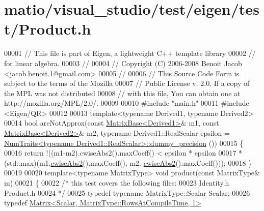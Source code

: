 \hypertarget{matio_2visual__studio_2test_2eigen_2test_2_product_8h_source}{}\section{matio/visual\+\_\+studio/test/eigen/test/\+Product.h}
\label{matio_2visual__studio_2test_2eigen_2test_2_product_8h_source}

\begin{DoxyCode}
00001 \textcolor{comment}{// This file is part of Eigen, a lightweight C++ template library}
00002 \textcolor{comment}{// for linear algebra.}
00003 \textcolor{comment}{//}
00004 \textcolor{comment}{// Copyright (C) 2006-2008 Benoit Jacob <jacob.benoit.1@gmail.com>}
00005 \textcolor{comment}{//}
00006 \textcolor{comment}{// This Source Code Form is subject to the terms of the Mozilla}
00007 \textcolor{comment}{// Public License v. 2.0. If a copy of the MPL was not distributed}
00008 \textcolor{comment}{// with this file, You can obtain one at http://mozilla.org/MPL/2.0/.}
00009 
00010 \textcolor{preprocessor}{#include "main.h"}
00011 \textcolor{preprocessor}{#include <Eigen/QR>}
00012 
00013 \textcolor{keyword}{template}<\textcolor{keyword}{typename} Derived1, \textcolor{keyword}{typename} Derived2>
00014 \textcolor{keywordtype}{bool} areNotApprox(\textcolor{keyword}{const} \hyperlink{group___core___module_class_eigen_1_1_matrix_base}{MatrixBase<Derived1>}& m1, \textcolor{keyword}{const} 
      \hyperlink{group___core___module_class_eigen_1_1_matrix_base}{MatrixBase<Derived2>}& m2, \textcolor{keyword}{typename} Derived1::RealScalar epsilon = 
      \hyperlink{group___core___module_struct_eigen_1_1_num_traits}{NumTraits<typename Derived1::RealScalar>::dummy\_precision}
      ())
00015 \{
00016   \textcolor{keywordflow}{return} !((m1-m2).cwiseAbs2().maxCoeff() < epsilon * epsilon
00017                           * (std::max)(m1.\hyperlink{group___core___module_a60808fcf09547e14952957bbdf75d3c6}{cwiseAbs2}().maxCoeff(), m2.
      \hyperlink{group___core___module_a60808fcf09547e14952957bbdf75d3c6}{cwiseAbs2}().maxCoeff()));
00018 \}
00019 
00020 \textcolor{keyword}{template}<\textcolor{keyword}{typename} MatrixType> \textcolor{keywordtype}{void} product(\textcolor{keyword}{const} MatrixType& m)
00021 \{
00022   \textcolor{comment}{/* this test covers the following files:}
00023 \textcolor{comment}{     Identity.h Product.h}
00024 \textcolor{comment}{  */}
00025   \textcolor{keyword}{typedef} \textcolor{keyword}{typename} MatrixType::Scalar Scalar;
00026   \textcolor{keyword}{typedef} \hyperlink{group___core___module_class_eigen_1_1_matrix}{Matrix<Scalar, MatrixType::RowsAtCompileTime, 1>} 

\end{DoxyCode}
